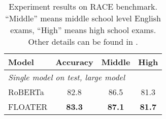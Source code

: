 \documentclass[11pt]{article}
\begin{document}
\begin{table*}[htb]
    \centering
    \caption{Experimental results on GLUE benchmark}
    \label{tab:exp-GLUE}
     \end{table*}

\begin{table}[htb]
    \centering
    \caption{Experiment results on RACE benchmark. ``Middle'' means middle school level English exams, ``High'' means high school exams. Other details can be found in \cite{lai2017race}.}
    \label{tab:race-benchmark}
    \begin{tabular}{lccc}
    \toprule
    Model & Accuracy & Middle & High \\
    \midrule
    \multicolumn{4}{l}{\textit{Single model on test, large model}}\\
    RoBERTa      & 82.8  & 86.5 & 81.3 \\
    FLOATER & \textbf{83.3}  & \textbf{87.1} & \textbf{81.7} \\
    \bottomrule
    \end{tabular}
\end{table}
\end{document}
